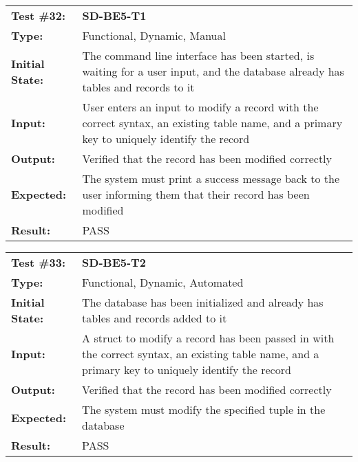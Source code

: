 \documentclass[12pt, titlepage]{article}
\begin{document}
\begin{mdframed}[linewidth=1pt]
\begin{tabularx}{\textwidth}{@{}p{3cm}X@{}}
{\bf Test \#32:} & {\bf SD-BE5-T1}\\[\baselineskip]
{\bf Type:} & Functional, Dynamic, Manual \\[0.5\baselineskip]
{\bf Initial State:} & The command line interface has been started, is waiting for a user input, and the database already has tables and records to it \\[\baselineskip]
{\bf Input:} & User enters an input to modify a record with the correct syntax, an existing table name, and a primary key to uniquely identify the record \\[\baselineskip]
{\bf Output:} & Verified that the record has been modified correctly \\[\baselineskip]
{\bf Expected:} & The system must print a success message back to the user informing them that their record has been modified \\[\baselineskip]
{\bf Result:} & PASS
\end{tabularx}
\end{mdframed} 

\begin{mdframed}[linewidth=1pt]
\begin{tabularx}{\textwidth}{@{}p{3cm}X@{}}
{\bf Test \#33:} & {\bf SD-BE5-T2}\\[\baselineskip]
{\bf Type:} & Functional, Dynamic, Automated \\[0.5\baselineskip]
{\bf Initial State:} & The database has been initialized and already has tables and records added to it \\[\baselineskip]
{\bf Input:} & A struct to modify a record has been passed in with the correct syntax, an existing table name, and a primary key to uniquely identify the record \\[\baselineskip]
{\bf Output:} & Verified that the record has been modified correctly \\[\baselineskip]
{\bf Expected:} & The system must modify the specified tuple in the database \\[\baselineskip]
{\bf Result:} & PASS
\end{tabularx}
\end{mdframed} 
\end{document}
